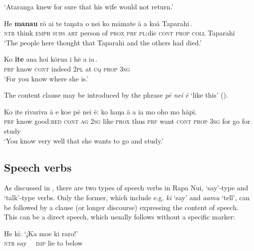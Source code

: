 \glt 
‘Ataranga knew for sure that his wife would not return.’ \textstyleExampleref{[R532-01.019]}
\z

\ea\label{ex:11.63}
\gll He \textbf{mana{\ꞌ}u} rō {\ꞌ}ai te taŋata o nei {\ob}ko māmate {\ꞌ}ā a koā Taparahi\,{\cb}.\\
\textsc{ntr} think \textsc{emph} \textsc{subs} \textsc{art} person of \textsc{prox} {\db}\textsc{prf} \textsc{pl}:die \textsc{cont} \textsc{prop} \textsc{coll} Taparahi\\

\glt 
‘The people here thought that Taparahi and the others had died.’ \textstyleExampleref{[R250.243]} 
\z

\ea\label{ex:11.64}
\gll Ko \textbf{{\ꞌ}ite} {\ꞌ}ana ho{\ꞌ}i kōrua {\ob}{\ꞌ}i hē a ia\,{\cb}.\\
\textsc{prf} know \textsc{cont} indeed \textsc{2pl} {\db}at \textsc{cq} \textsc{prop} \textsc{3sg}\\

\glt
‘For you know where she is.’ \textstyleExampleref{[R229.277]} 
\z

The content clause may be introduced by the phrase \textit{pē nei} \textit{ē} ‘like this’ ().

\ea\label{ex:11.65}
\gll Ko {\ꞌ}ite rivariva {\ꞌ}ā e koe pē nei ē: ko haŋa {\ꞌ}ā a ia  mo oho mo hāpī.\\
\textsc{prf} know good:\textsc{red} \textsc{cont} \textsc{ag} \textsc{2sg} like \textsc{prox} thus \textsc{prf} want \textsc{cont} \textsc{prop} \textsc{3sg}  for go for study\\

\glt 
‘You know very well that she wants to go and study.’ \textstyleExampleref{[R210.066]} 
\z
{}
\subsection{Speech verbs}\label{sec:11.3.4}
As discussed in , there are two types of speech verbs in Rapa Nui, ‘say’-type and ‘talk’-type verbs. Only the former, which include e.g. \textit{kī} ‘say’ and \textit{\mbox{{\ꞌ}a{\ꞌ}amu}} ‘tell’, can be followed by a clause (or longer discourse) expressing the content of speech. This can be a direct speech, which usually follows without a specific marker:

\ea\label{ex:11.66}
\gll He kī: ‘¡Ka moe ki raro!’\\
\textsc{ntr} say ~~\textsc{imp} lie to below\\

